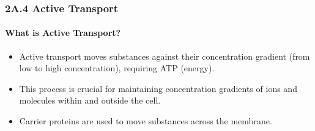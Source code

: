 
\subsubsection{2A.4 Active Transport}
\paragraph{What is Active Transport?}
\begin{itemize}
    \item Active transport moves substances against their concentration gradient (from low to high concentration), requiring
    ATP (energy).
    \item This process is crucial for maintaining concentration gradients of ions and molecules within and outside the cell.
    \item Carrier proteins are used to move substances across the membrane.
\end{itemize}
